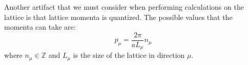 \documentclass[11pt, oneside]{article}   	%
\theoremstyle{definition}
\begin{document}
Another artifact that we must consider when performing calculations on the lattice is that lattice momenta is quantized. 
The possible values that the momenta can take are:
\begin{equation}
	p_\mu = \frac{2\pi}{aL_\mu} n_\mu
\end{equation}
where $n_\mu\in\mathbb Z$ and $L_\mu$ is the size of the lattice in direction $\mu$. 

\end{document}
